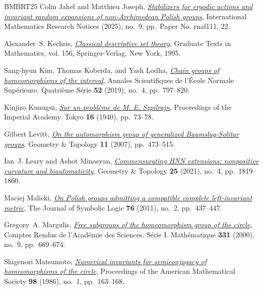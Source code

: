 \documentclass[reqno]{amsart}
\begin{document}
\begin{thebibliography}{BMBRT25}
Colin Jahel and Matthieu Joseph, \href{https://doi.org/10.1093/imrn/rnaf111}{\emph{Stabilizers for ergodic actions and invariant random expansions of non-{A}rchimedean {P}olish groups}}, International Mathematics Research Notices (2025), no.~9, pp.~Paper No. rnaf111, 22.

Alexander~S. Kechris, \href{https://doi.org/10.1007/978-1-4612-4190-4}{\emph{Classical descriptive set theory}}, Graduate Texts in Mathematics, vol. 156, Springer-Verlag, New York, 1995.

Sang-hyun Kim, Thomas Koberda, and Yash Lodha, \href{https://doi.org/10.24033/asens.2397}{\emph{Chain groups of homeomorphisms of the interval}}, Annales Scientifiques de l'\'{E}cole Normale Sup\'{e}rieure. Quatri\`eme S\'{e}rie \textbf{52} (2019), no.~4, pp.~797--820.

Kinjiro Kunugui, \href{http://projecteuclid.org/euclid.pja/1195579208}{\emph{Sur un probl\`{e}me de {M}. {E}. {S}zpilrajn}}, Proceedings of the Imperial Academy. Tokyo \textbf{16} (1940), pp.~73--78.

Gilbert Levitt, \href{https://doi.org/10.2140/gt.2007.11.473}{\emph{On the automorphism group of generalized {B}aumslag-{S}olitar groups}}, Geometry \& Topology \textbf{11} (2007), pp.~473--515.

Ian~J. Leary and Ashot Minasyan, \href{https://doi.org/10.2140/gt.2021.25.1819}{\emph{Commensurating {HNN} extensions: nonpositive curvature and biautomaticity}}, Geometry \& Topology \textbf{25} (2021), no.~4, pp.~1819--1860.

Maciej Malicki, \href{https://doi.org/10.2178/jsl/1305810757}{\emph{On {P}olish groups admitting a compatible complete left-invariant metric}}, The Journal of Symbolic Logic \textbf{76} (2011), no.~2, pp.~437--447.

Gregory~A. Margulis, \href{https://doi.org/10.1016/S0764-4442(00)01694-3}{\emph{Free subgroups of the homeomorphism group of the circle}}, Comptes Rendus de l'Acad\'{e}mie des Sciences. S\'{e}rie I. Math\'{e}matique \textbf{331} (2000), no.~9, pp.~669--674.

Shigenori Matsumoto, \href{https://doi.org/10.2307/2045788}{\emph{Numerical invariants for semiconjugacy of homeomorphisms of the circle}}, Proceedings of the American Mathematical Society \textbf{98} (1986), no.~1, pp.~163--168.


\end{thebibliography}
\end{document}
